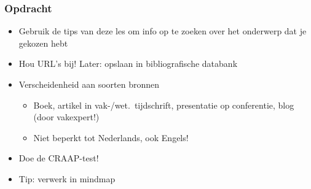 \documentclass[aspectratio=169]{beamer}
\begin{document}
\begin{frame}
  \frametitle{Opdracht}

  \begin{itemize}
    \item Gebruik de tips van deze les om info op te zoeken over het onderwerp dat je gekozen hebt
    \item Hou URL's bij! Later: opslaan in bibliografische databank
    \item Verscheidenheid aan soorten bronnen
          \begin{itemize}
            \item Boek, artikel in vak-/wet.\ tijdschrift, presentatie op conferentie, blog (door vakexpert!)
            \item Niet beperkt tot Nederlands, ook Engels!
          \end{itemize}
    \item Doe de CRAAP-test!
    \item Tip: verwerk in mindmap
  \end{itemize}

\end{frame}
\end{document}
